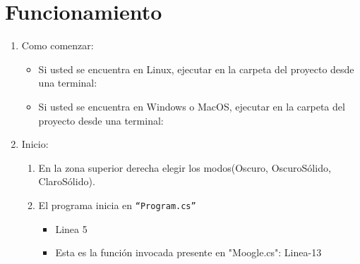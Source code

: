 \documentclass{article}
\begin{document}
\section{Funcionamiento}
\begin{enumerate}
    \item Como comenzar:
        \begin{itemize}
            \item Si usted se encuentra en Linux, ejecutar en la carpeta del proyecto desde una terminal:
        

            \item Si usted se encuentra en Windows o MacOS, ejecutar en la carpeta del proyecto desde una terminal: 
            
        \end{itemize}
    \item Inicio:
        \begin{enumerate}
            \item En la zona superior derecha elegir los modos(Oscuro, OscuroSólido, ClaroSólido).
            \item El programa inicia en \texttt{``Program.cs''}
            \begin{itemize}
                \item Linea 5 
                \item Esta es la función invocada presente en "Moogle.cs": Linea-13 
                

\end{itemize}
\end{enumerate}
\end{enumerate}
\end{document}
